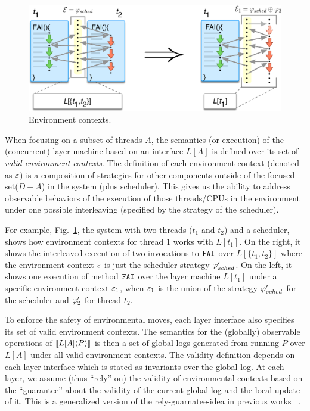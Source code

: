 \begin{figure}[t]
\centering
\includegraphics[scale=0.6]{figs/ccal/pcomp}
\caption{Environment contexts.}
\label{fig:chapter:ccal:env-contexs}
\end{figure}

When focusing on a subset of threads $A$, the semantics (or execution) of the (concurrent) layer machine based on an
interface $L[A]$ is defined over its set of \emph{valid environment
contexts}. 
The definition of each  environment context (denoted as $\oracle$) is
a composition  of strategies for other components outside of the focused set($D - A$) in the 
system (plus scheduler).
This gives us the ability to address observable behaviors of the
execution of those threads/CPUs in the environment under one possible
interleaving (specified by the strategy of the scheduler).

For example, Fig.~\ref{fig:chapter:ccal:env-contexs}, 
the system with two threads
($t_1$ and $t_2$) and a scheduler,
shows how
environment contexts for thread $1$ works with $L[t_1]$.  
On the right, it shows the interleaved execution of
two invocations to ${\mathrm{\texttt{FAI}}}$ over $L[\{t_1,t_2\}]$
where the environment context $\oracle$ is just the scheduler
strategy $\varphi'_{sched}$.
On the left, it shows one execution
of method ${\mathrm{\texttt{FAI}}}$ over the layer machine $L[t_1]$ under a specific
environment context $\oracle_1$, when $\oracle_1$ is the union of
the strategy $\varphi'_{sched}$ for the scheduler and $\varphi'_{2}$ for
thread $t_2$. 


To enforce the safety of environmental moves,
each layer interface also specifies its set of valid environment contexts.
The semantics for the (globally) observable operations of $[\![{L[A]} \langle {P} \rangle]\!]$ is then a set of global logs
generated from running $P$ over $L[A]$ under all valid
environment contexts. 
The validity definition depends on each layer interface which is stated as invariants over the global log. 
At each layer, we assume (thus ``rely'' on) the validity of environmental contexts based on the ``guarantee'' about the validity of the current global log and the local update of it. 
This is a generalized version of the rely-guarnatee-idea in previous works ~\cite{feng07:sagl,vafeiadis:marriage,LRG,fu10:roch,sergey15}. 

